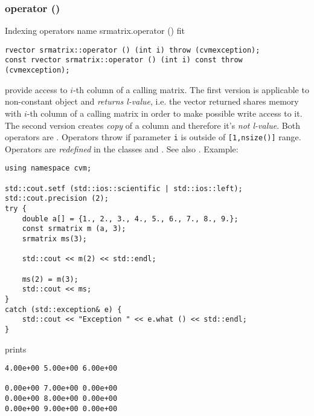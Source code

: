 \subsubsection{operator ()}
Indexing operators%
\pdfdest name {srmatrix.operator ()} fit
\begin{verbatim}
rvector srmatrix::operator () (int i) throw (cvmexception);
const rvector srmatrix::operator () (int i) const throw (cvmexception);
\end{verbatim}
provide access to \hbox{$i$-th} column of a calling matrix. The first version
is applicable to  non-constant object and
\emph{returns  l-value}, i.e. the vector returned shares  memory
with \hbox{$i$-th} column of a calling matrix
in order to make possible write access to it.
The second version creates  \emph{copy} of a column and therefore it's
\emph{not  l-value}.
Both operators are \Based.
Operators throw 
if parameter \verb"i" is outside of \verb"[1,nsize()]" range.
Operators are \emph{redefined}
in the classes 
and .
See also .
Example:
\begin{Verbatim}
using namespace cvm;

std::cout.setf (std::ios::scientific | std::ios::left); 
std::cout.precision (2);
try {
    double a[] = {1., 2., 3., 4., 5., 6., 7., 8., 9.};
    const srmatrix m (a, 3);
    srmatrix ms(3);

    std::cout << m(2) << std::endl;

    ms(2) = m(3);
    std::cout << ms;
}
catch (std::exception& e) {
    std::cout << "Exception " << e.what () << std::endl;
}
\end{Verbatim}
prints
\begin{Verbatim}
4.00e+00 5.00e+00 6.00e+00

0.00e+00 7.00e+00 0.00e+00
0.00e+00 8.00e+00 0.00e+00
0.00e+00 9.00e+00 0.00e+00
\end{Verbatim}
\newpage



